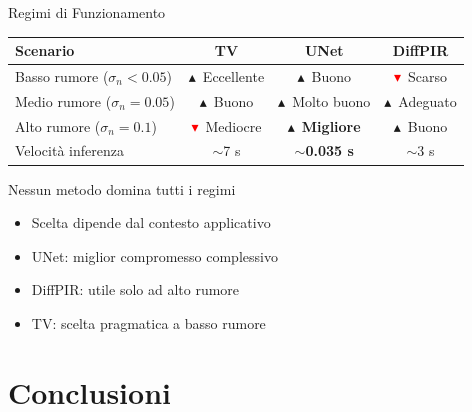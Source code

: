 \documentclass[italian,10pt]{beamer}
\newcommand{\upgreen}{\textcolor{green!50!black}{$\blacktriangle$}}
\newcommand{\downred}{\textcolor{red}{$\blacktriangledown$}}
\begin{document}
\begin{frame}{Regimi di Funzionamento}
  \begin{center}
    \begin{tabular}{lccc}\toprule
      \textbf{Scenario} & \textbf{TV} & \textbf{UNet} & \textbf{DiffPIR}\\\midrule
      Basso rumore ($\sigma_n<0.05$) & \upgreen\ Eccellente & \upgreen\ Buono & \downred\ Scarso\\
      Medio rumore ($\sigma_n=0.05$) & \upgreen\ Buono & \upgreen\ Molto buono & \upgreen\ Adeguato\\
      Alto rumore ($\sigma_n=0.1$)   & \downred\ Mediocre & \upgreen\ \textbf{Migliore} & \upgreen\ Buono\\
      Velocit\`a inferenza           & $\sim$7 s & $\sim$\textbf{0.035 s} & $\sim$3 s\\\bottomrule
    \end{tabular}
  \end{center}
  \vspace{0.3cm}
  \begin{block}{Nessun metodo domina tutti i regimi}
    \begin{itemize}
      \item Scelta dipende dal contesto applicativo
      \item UNet: miglior compromesso complessivo
      \item DiffPIR: utile solo ad alto rumore
      \item TV: scelta pragmatica a basso rumore
    \end{itemize}
  \end{block}
\end{frame}

\section{Conclusioni}
\end{document}
